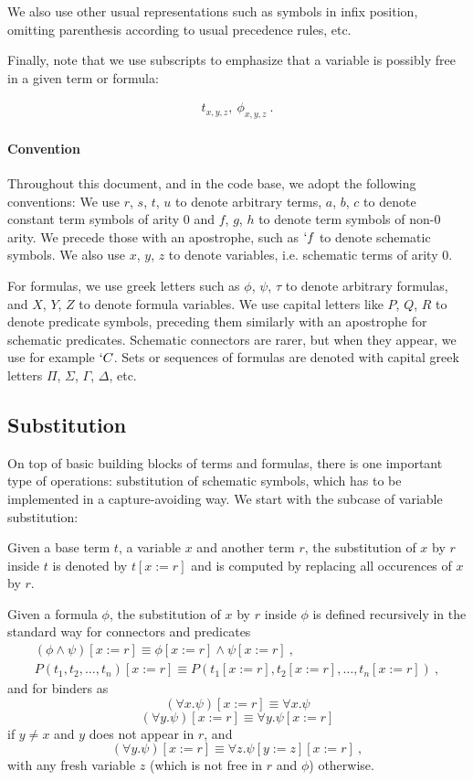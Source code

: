 We also use other usual representations such as symbols in infix position, omitting parenthesis according to usual precedence rules, etc.

Finally, note that we use subscripts to emphasize that a variable is possibly free in a given term or formula:

\begin{gather*}
  t_{x,y,z}, ~\phi_{x,y,z}~.
\end{gather*}

\paragraph{Convention} Throughout this document, and in the code base, we adopt the following conventions: We use $r$, $s$, $t$, $u$ to denote arbitrary terms, $a$, $b$, $c$ to denote constant term symbols of arity $0$ and $f$, $g$, $h$ to denote term symbols of non-0 arity. We precede those with an apostrophe, such as $`f$ to denote schematic symbols. We also use $x$, $y$, $z$ to denote variables, i.e. schematic terms of arity $0$.

For formulas, we use greek letters such as $\phi$, $\psi$, $\tau$ to denote arbitrary formulas, and $X$, $Y$, $Z$ to denote formula variables. We use capital letters like $P$, $Q$, $R$ to denote predicate symbols, preceding them similarly with an apostrophe for schematic predicates. Schematic connectors are rarer, but when they appear, we use for example $`C$. Sets or sequences of formulas are denoted with capital greek letters $\Pi$, $\Sigma$, $\Gamma$, $\Delta$, etc.

\subsection{Substitution}
\label{subsec:substitution}
On top of basic building blocks of terms and formulas, there is one important type of operations: substitution of schematic symbols, which has to be implemented in a capture-avoiding way. We start with the subcase of variable substitution:
\begin{defin}
  Given a base term $t$, a variable $x$ and another term $r$, the substitution of $x$ by $r$ inside $t$ is denoted by $ t[x := r] $ and is computed by replacing all occurences of $x$ by $r$.

  Given a formula $\phi$, the substitution of $x$ by $r$ inside $\phi$ is defined recursively in the standard way for connectors and predicates
  \begin{gather*}
    (\phi \land \psi)[x := r] \equiv \phi[x := r] \land \psi[x := r]~,\\
    P(t_1, t_2, \ldots, t_n)[x := r] \equiv P(t_1[x := r], t_2[x := r], \ldots, t_n[x := r])~,
  \end{gather*}
  and for binders as
  $$
    (\forall x. \psi)[x := r] \equiv \forall x. \psi
  $$
  $$
    (\forall y. \psi)[x := r] \equiv \forall y. \psi[x := r]
  $$
  if $y \neq x$ and $y$ does not appear in $r$, and
  $$
    (\forall y. \psi)[x := r] \equiv \forall z. \psi[y := z][x := r]~,
  $$
  with any fresh variable $z$ (which is not free in $r$ and $\phi$) otherwise.
\end{defin}


